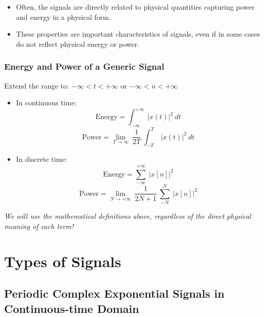 \documentclass[12pt,a4paper]{article}
\begin{document}
\begin{itemize}
 \item Often, the signals are directly related to physical quantities capturing power and energy in a physical form.
 \item These properties are important characteristics of signals, even if in some cases do not reflect physical energy or power.
\end{itemize}

\subsubsection{Energy and Power of a Generic Signal}
Extend the range to: $-\infty<t<+\infty$ or $-\infty<n<+\infty$ 
\begin{itemize}
 \item In continuous time:
  \[ \text{Energy}= \int_{-\infty}^{+\infty} \ \lvert x(t) \rvert^2 \ dt \]
  \[ \text{Power}= \lim_{T \to \infty} \ \frac{1}{2T} \ \int_{-T}^{T} \ \lvert x(t) \rvert^2 \ dt \]
 \item In discrete time:
  \[ \text{Energy}= \sum_{-\infty}^{+\infty} \ \lvert x[n] \rvert^2 \]
  \[ \text{Power}=\lim_{N \to +\infty} \ \frac{1}{2N+1} \ \sum_{-N}^{N} \ \lvert x[n] \rvert^2 \]
\end{itemize}
\textit{We will use the mathematical definitions above, regardless of the direct physical meaning of each term!}

\newpage
\section{Types of Signals}

\subsection{Periodic Complex Exponential Signals in Continuous-time Domain}
\end{document}
